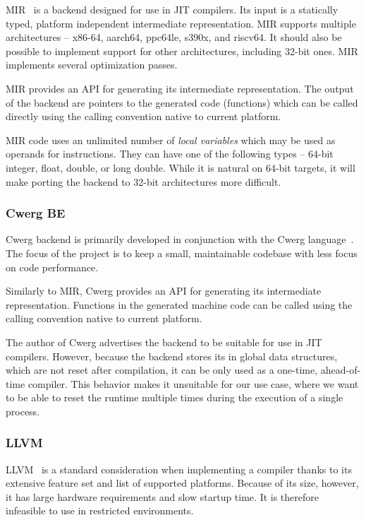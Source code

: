 MIR~\cite{mir} is a backend designed for use in JIT compilers. Its input is a statically typed, platform independent intermediate representation. MIR supports multiple architectures -- x86-64, aarch64, ppc64le, s390x, and riscv64. It should also be possible to implement support for other architectures, including 32-bit ones. MIR implements several optimization passes.

MIR provides an API for generating its intermediate representation. The output of the backend are pointers to the generated code (functions) which can be called directly using the calling convention native to current platform.

MIR code uses an unlimited number of \textit{local variables} which may be used as operands for instructions. They can have one of the following types -- 64-bit integer, float, double, or long double. While it is natural on 64-bit targets, it will make porting the backend to 32-bit architectures more difficult.


\subsubsection{Cwerg BE}

Cwerg backend is primarily developed in conjunction with the Cwerg language~\cite{cwerg}. The focus of the project is to keep a small, maintainable codebase with less focus on code performance.

Similarly to MIR, Cwerg provides an API for generating its intermediate representation. Functions in the generated machine code can be called using the calling convention native to current platform.

The author of Cwerg advertises the backend to be suitable for use in JIT compilers. However, because the backend stores its in global data structures, which are not reset after compilation, it can be only used as a one-time, ahead-of-time compiler. This behavior makes it unsuitable for our use case, where we want to be able to reset the runtime multiple times during the execution of a single process.


\subsubsection{LLVM}

LLVM~\cite{llvm} is a standard consideration when implementing a compiler thanks to its extensive feature set and list of supported platforms. Because of its size, however, it has large hardware requirements and slow startup time. It is therefore infeasible to use in restricted environments.


